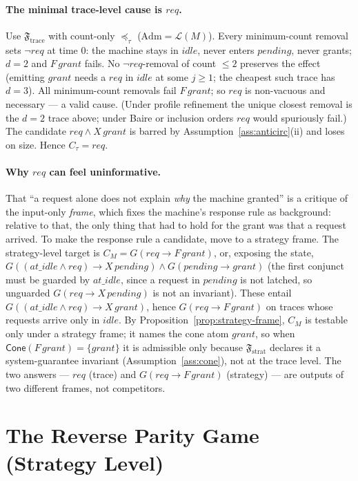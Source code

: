 \documentclass[11pt]{article}
\theoremstyle{remark}
\newcommand{\Lang}{\mathcal{L}}
\newcommand{\Frame}{\mathfrak{F}}
\newcommand{\Adm}{\mathrm{Adm}}
\begin{document}
\paragraph{The minimal trace-level cause is \(req\).} Use \(\Frame_{\mathrm{trace}}\)
with count-only \(\preceq_\tau\) (\(\Adm=\Lang(M)\)). Every minimum-count removal
sets \(\neg req\) at time \(0\): the machine stays in \(idle\), never enters
\(pending\), never grants; \(d=2\) and \(F\,grant\) fails. No \(\neg req\)-removal
of count \(\le2\) preserves the effect (emitting \(grant\) needs a \(req\) in
\(idle\) at some \(j\ge1\); the cheapest such trace has \(d=3\)). All minimum-count
removals fail \(F\,grant\); so \(req\) is non-vacuous and necessary --- a valid
cause. (Under profile refinement the unique closest removal is the \(d=2\) trace
above; under Baire or inclusion orders \(req\) would spuriously fail.) The candidate
\(req\land X\,grant\) is barred by Assumption~\ref{ass:anticirc}(ii) and loses on
size. Hence \(C_\tau=req\).

\paragraph{Why \(req\) can feel uninformative.} That ``a request alone does not
explain \emph{why} the machine granted'' is a critique of the input-only
\emph{frame}, which fixes the machine's response rule as background: relative to
that, the only thing that had to hold for the grant was that a request arrived. To
make the response rule a candidate, move to a strategy frame. The strategy-level
target is \(C_M=G(req\rightarrow F\,grant)\), or, exposing the state,
\(G((\mathit{at\_idle}\land req)\rightarrow X\,pending)\land G(pending\rightarrow
grant)\) (the first conjunct must be guarded by \(\mathit{at\_idle}\), since a
request in \(pending\) is not latched, so unguarded \(G(req\to X\,pending)\) is not
an invariant). These entail \(G((\mathit{at\_idle}\land req)\rightarrow X\,grant)\),
hence \(G(req\rightarrow F\,grant)\) on traces whose requests arrive only in
\(idle\). By Proposition~\ref{prop:strategy-frame}, \(C_M\) is testable only under
a strategy frame; it names the cone atom \(grant\), so when
\(\mathsf{Cone}(F\,grant)=\{grant\}\) it is admissible only because
\(\Frame_{\mathrm{strat}}\) declares it a system-guarantee invariant
(Assumption~\ref{ass:cone}), not at the trace level. The two answers --- \(req\) (trace) and
\(G(req\to F\,grant)\) (strategy) --- are outputs of two different frames, not
competitors.

\section{The Reverse Parity Game (Strategy Level)}
\label{sec:rpg}
\end{document}

